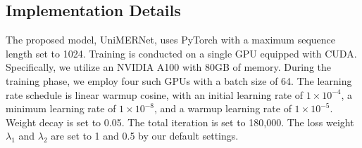 \documentclass[runningheads]{llncs}
\begin{document}
\subsection{Implementation Details}

The proposed model, UniMERNet, uses PyTorch with a maximum sequence length set to 1024. Training is conducted on a single GPU equipped with CUDA. Specifically, we utilize an NVIDIA A100 with 80GB of memory. During the training phase, we employ four such GPUs with a batch size of 64. The learning rate schedule is linear warmup cosine, with an initial learning rate of $1 \times 10^{-4}$, a minimum learning rate of $1 \times 10^{-8}$, and a warmup learning rate of $1 \times 10^{-5}$. Weight decay is set to 0.05. The total iteration is set to 180,000. The loss weight $\lambda_1$ and $\lambda_2$ are set to 1 and 0.5 by our default settings.

\begin{table}[t]
\footnotesize
\centering
\caption{Ablation results on UniMER-Test for models using different augmentations. Here, ``HME'' refers to a mixed dataset of CHROME and HME100K.}

\end{table}
\end{document}
